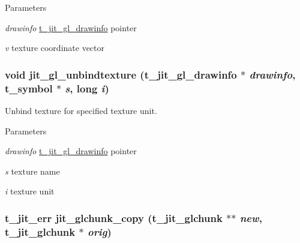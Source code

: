 \begin{DoxyParams}{Parameters}
\item[{\em drawinfo}]\hyperlink{structt__jit__gl__drawinfo}{t\_\-jit\_\-gl\_\-drawinfo} pointer \item[{\em v}]texture coordinate vector \end{DoxyParams}
\hypertarget{group__ob3dmod_gac79a96d9c6d801778bd9675c4c5f51ec}{
\subsubsection[{jit\_\-gl\_\-unbindtexture}]{\setlength{\rightskip}{0pt plus 5cm}void jit\_\-gl\_\-unbindtexture ({\bf t\_\-jit\_\-gl\_\-drawinfo} $\ast$ {\em drawinfo}, \/  {\bf t\_\-symbol} $\ast$ {\em s}, \/  long {\em i})}}
\label{group__ob3dmod_gac79a96d9c6d801778bd9675c4c5f51ec}


Unbind texture for specified texture unit. 
\begin{DoxyParams}{Parameters}
\item[{\em drawinfo}]\hyperlink{structt__jit__gl__drawinfo}{t\_\-jit\_\-gl\_\-drawinfo} pointer \item[{\em s}]texture name \item[{\em i}]texture unit \end{DoxyParams}
\hypertarget{group__ob3dmod_gae9cc3acec721f3e56a41664b5891b900}{
\subsubsection[{jit\_\-glchunk\_\-copy}]{\setlength{\rightskip}{0pt plus 5cm}t\_\-jit\_\-err jit\_\-glchunk\_\-copy ({\bf t\_\-jit\_\-glchunk} $\ast$$\ast$ {\em new}, \/  {\bf t\_\-jit\_\-glchunk} $\ast$ {\em orig})}}
\label{group__ob3dmod_gae9cc3acec721f3e56a41664b5891b900}


